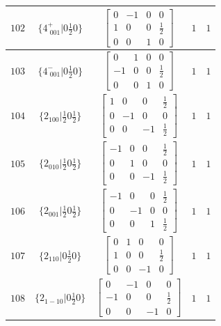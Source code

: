 \documentclass[fleqn,8pt]{jsarticle}
\begin{document}
\begin{longtable}{ccccc}
$ 102 $ & $ \{4^{+}_{\,\,001}|0 \frac{1}{2} 0\} $ & $ \begin{bmatrix} 0 & -1 & 0 & 0 \\ 1 & 0 & 0 & \frac{1}{2} \\ 0 & 0 & 1 & 0 \end{bmatrix} $ & $ 1 $ & $ 1 $ \\ \hline
$ 103 $ & $ \{4^{-}_{\,\,001}|0 \frac{1}{2} 0\} $ & $ \begin{bmatrix} 0 & 1 & 0 & 0 \\ -1 & 0 & 0 & \frac{1}{2} \\ 0 & 0 & 1 & 0 \end{bmatrix} $ & $ 1 $ & $ 1 $ \\ \hline
$ 104 $ & $ \{2{}_{100}|\frac{1}{2} 0 \frac{1}{2}\} $ & $ \begin{bmatrix} 1 & 0 & 0 & \frac{1}{2} \\ 0 & -1 & 0 & 0 \\ 0 & 0 & -1 & \frac{1}{2} \end{bmatrix} $ & $ 1 $ & $ 1 $ \\ \hline
$ 105 $ & $ \{2{}_{010}|\frac{1}{2} 0 \frac{1}{2}\} $ & $ \begin{bmatrix} -1 & 0 & 0 & \frac{1}{2} \\ 0 & 1 & 0 & 0 \\ 0 & 0 & -1 & \frac{1}{2} \end{bmatrix} $ & $ 1 $ & $ 1 $ \\ \hline
$ 106 $ & $ \{2{}_{001}|\frac{1}{2} 0 \frac{1}{2}\} $ & $ \begin{bmatrix} -1 & 0 & 0 & \frac{1}{2} \\ 0 & -1 & 0 & 0 \\ 0 & 0 & 1 & \frac{1}{2} \end{bmatrix} $ & $ 1 $ & $ 1 $ \\ \hline
$ 107 $ & $ \{2{}_{110}|0 \frac{1}{2} 0\} $ & $ \begin{bmatrix} 0 & 1 & 0 & 0 \\ 1 & 0 & 0 & \frac{1}{2} \\ 0 & 0 & -1 & 0 \end{bmatrix} $ & $ 1 $ & $ 1 $ \\ \hline
$ 108 $ & $ \{2{}_{1-10}|0 \frac{1}{2} 0\} $ & $ \begin{bmatrix} 0 & -1 & 0 & 0 \\ -1 & 0 & 0 & \frac{1}{2} \\ 0 & 0 & -1 & 0 \end{bmatrix} $ & $ 1 $ & $ 1 $ \\ \hline

\end{longtable}
\end{document}
